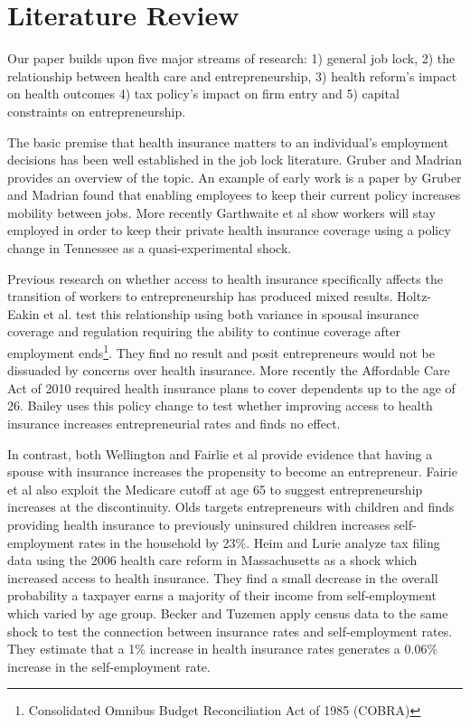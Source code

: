 \documentclass[12pt]{article}
\begin{document}
\section{Literature Review}
\label{sec:review}

Our paper builds upon five major streams of research: 1) general job lock, 2) the relationship between health care and entrepreneurship, 3) health reform's impact on health outcomes 4) tax policy's impact on firm entry and 5) capital constraints on entrepreneurship. 

The basic premise that health insurance matters to an individual's employment decisions has been well established in the job lock literature. Gruber and Madrian \cite{gm2002} provides an overview of the topic. An example of early work is a paper by Gruber and Madrian \cite{gruberMadrian} found that enabling employees to keep their current policy increases mobility between jobs. More recently Garthwaite \cite{garthwaite} et al show workers will stay employed in order to keep their private health insurance coverage using a policy change in Tennessee as a quasi-experimental shock. 

Previous research on whether access to health insurance specifically affects the transition of workers to entrepreneurship has produced mixed results. Holtz-Eakin et al. \cite{holtz_health} test this relationship using both variance in spousal insurance coverage and regulation requiring the ability to continue coverage after employment ends\footnote{Consolidated Omnibus Budget Reconciliation Act of 1985 (COBRA)}. They find no result and posit entrepreneurs would not be dissuaded by concerns over health insurance. More recently the Affordable Care Act of 2010 required health insurance plans to cover dependents up to the age of 26. Bailey \cite{bailey} uses this policy change to test whether improving access to health insurance increases entrepreneurial rates and finds no effect. 

In contrast, both Wellington \cite{wellington} and Fairlie et al \cite{fairlie_health} provide evidence that having a spouse with insurance increases the propensity to become an entrepreneur. Fairie et al \cite{fairlie_health} also exploit the Medicare cutoff at age 65 to suggest entrepreneurship increases at the discontinuity. Olds \cite{olds} targets entrepreneurs with children and finds providing health insurance to previously uninsured children increases self-employment rates in the household by 23\%. Heim and Lurie \cite{heimLurie} analyze tax filing data using the 2006 health care reform in Massachusetts as a shock which increased access to health insurance. They find a small decrease in the overall probability a taxpayer earns a majority of their income from self-employment which varied by age group. Becker and Tuzemen \cite{tuzemen} apply census data to the same shock to test the connection between insurance rates and self-employment rates. They estimate that a 1\% increase in health insurance rates generates a 0.06\% increase in the self-employment rate. 
\end{document}
